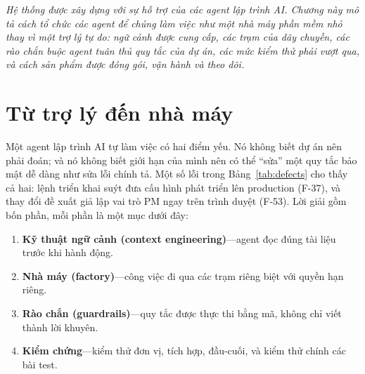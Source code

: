 \documentclass[../main.tex]{subfiles}
\begin{document}
\textit{Hệ thống được xây dựng với sự hỗ trợ của các agent lập trình AI. Chương này mô tả cách tổ
chức các agent để chúng làm việc như một nhà máy phần mềm nhỏ thay vì một trợ lý tự do: ngữ cảnh
được cung cấp, các trạm của dây chuyền, các rào chắn buộc agent tuân thủ quy tắc của dự án, các
mức kiểm thử phải vượt qua, và cách sản phẩm được đóng gói, vận hành và theo dõi.}

\section{Từ trợ lý đến nhà máy}
Một agent lập trình AI tự làm việc có hai điểm yếu. Nó không biết dự án nên phải đoán; và nó không
biết giới hạn của mình nên có thể ``sửa'' một quy tắc bảo mật dễ dàng như sửa lỗi chính tả. Một số
lỗi trong Bảng~\ref{tab:defects} cho thấy cả hai: lệnh triển khai suýt đưa cấu hình phát triển lên
production (F-37), và thay đổi đề xuất giả lập vai trò PM ngay trên trình duyệt (F-53). Lời giải gồm
bốn phần, mỗi phần là một mục dưới đây:
\begin{enumerate}
  \item \textbf{Kỹ thuật ngữ cảnh (context engineering)}---agent đọc đúng tài liệu trước khi hành động.
  \item \textbf{Nhà máy (factory)}---công việc đi qua các trạm riêng biệt với quyền hạn riêng.
  \item \textbf{Rào chắn (guardrails)}---quy tắc được thực thi bằng mã, không chỉ viết thành lời khuyên.
  \item \textbf{Kiểm chứng}---kiểm thử đơn vị, tích hợp, đầu-cuối, và kiểm thử chính các bài test.
\end{enumerate}
\end{document}

